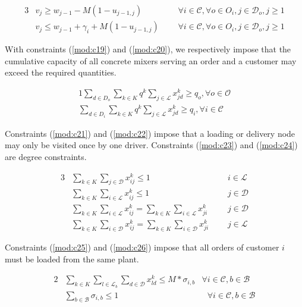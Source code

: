 \documentclass{article}
\begin{document}
\begin{alignat}{3}
  \label{mod:c17} & v_{j} \geq w_{j-1} - M(1- u_{j-1,j}) & \text{} & \forall i \in \mathcal{C}, \forall o \in O_i, j \in \mathcal{D}_{o}, j \geq 1 \\
  \label{mod:c18} &  v_{j}  \leq  w_{j-1} + \gamma_i + M(1- u_{j-1,j}) & \text{ } & \forall i \in \mathcal{C}, \forall o \in O_i, j \in \mathcal{D}_{o}, j \geq 1
\end{alignat}

With constraints (\ref{mod:c19}) and (\ref{mod:c20}), we respectively impose that the cumulative capacity of all concrete mixers serving an order and a customer may exceed the required quantities.

\begin{alignat}{1}
    \label{mod:c19} \sum_{d \in D_o}\sum_{k \in K}{q^k} \sum_{j \in \mathcal{L}}{x^k_{jd}}\geq q_o, \forall o \in \mathcal{O} \\
    \label{mod:c20} \sum_{d \in D_i}\sum_{k \in K}{q^k} \sum_{j \in \mathcal{L}}{x^k_{jd}}\geq q_i, \forall i \in \mathcal{C}
\end{alignat}

Constraints (\ref{mod:c21}) and (\ref{mod:c22}) impose that a loading or delivery node may only be visited once by one driver. Constraints (\ref{mod:c23}) and (\ref{mod:c24}) are degree constraints.

\begin{alignat}{3}
\label{mod:c21} &  \sum_{k \in K}\sum_{j \in \mathcal{D}}{x^{k}_{ij} \leq 1} & \text{ } & i \in \mathcal{L}\\
  \label{mod:c22}  &  \sum_{k \in K}\sum_{i \in \mathcal{L}}{x^{k}_{ij} \leq 1} & \text{ } & j \in \mathcal{D} \\
  \label{mod:c23}  &  \sum_{k \in K}\sum_{i \in \mathcal{L}}{x^{k}_{ij} } =  \sum_{k \in K}\sum_{i \in \mathcal{L}}{x^{k}_{ji} } & \text{ } & j \in \mathcal{D} \\
  \label{mod:c24}  &  \sum_{k \in K}\sum_{i \in \mathcal{D}}{x^{k}_{ij} } =  \sum_{k \in K}\sum_{i \in \mathcal{D}}{x^{k}_{ji} } & \text{ } & j \in \mathcal{L}
\end{alignat}

 Constraints (\ref{mod:c25}) and (\ref{mod:c26}) impose that all orders of customer $i$ must be loaded from the same plant.
 
\begin{alignat}{2}
    \label{mod:c25} & \sum_{k \in K} \sum_{l \in \mathcal{L}_b} \sum_{d \in \mathcal{D}}{x^k_{ld}} \leq M*\sigma_{i, b} & \forall i \in \mathcal{C}, b \in \mathcal{B} \\
    \label{mod:c26} & \sum_{b \in \mathcal{B}} \sigma_{i, b} \leq 1 & \text{ } \forall i \in \mathcal{C}, b \in \mathcal{B} 
\end{alignat}
\end{document}
